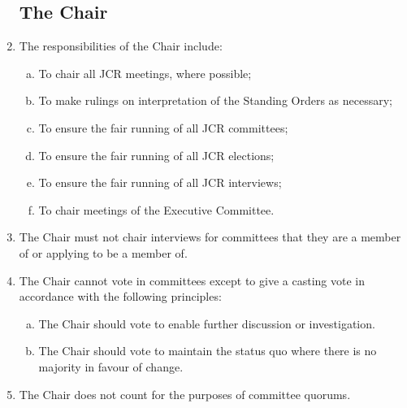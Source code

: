 \documentclass[12pt]{article}  %
\begin{document}
\begin{enumerate}
    \subsection{The Chair}
    \item The responsibilities of the Chair include:
    \begin{enumerate}[(a)]
        \item To chair all JCR meetings, where possible;
        \item To make rulings on interpretation of the Standing Orders as necessary;
        \item To ensure the fair running of all JCR committees;
        \item To ensure the fair running of all JCR elections;
        \item To ensure the fair running of all JCR interviews;
        \item To chair meetings of the Executive Committee.
    \end{enumerate}
    \item The Chair must not chair interviews for committees that they are a member of or applying to be a member of.
    \item The Chair cannot vote in committees except to give a casting vote in accordance with the following principles:
    \begin{enumerate}[(a)]
        \item The Chair should vote to enable further discussion or investigation.
        \item The Chair should vote to maintain the status quo where there is no majority in favour of change.
    \end{enumerate}
    \item The Chair does not count for the purposes of committee quorums.
\end{enumerate}
\newpage
\end{document}
